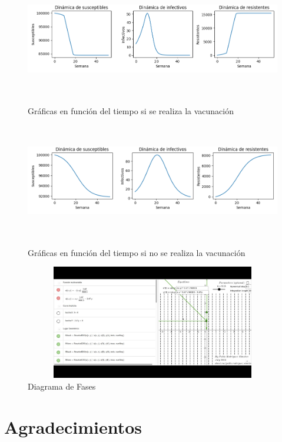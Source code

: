 \documentclass{wscpaperproc}
\theoremstyle{wsc}
\begin{document}
\begin{figure}
	\centering
	\includegraphics[width=1.0\textwidth,height=5cm]{Figure_1.png}
	\caption{Gráficas en función del tiempo si se realiza la vacunación}
	\centering
	\includegraphics[width=1.0\textwidth,height=5cm]{Figure_2.png}
	\caption{Gráficas en función del tiempo si no se realiza la vacunación}\centering
	\includegraphics[width=1.0\textwidth,height=5cm]{fig3.jpg}
	\caption{Diagrama de Fases }

  \end{figure}




\clearpage
\section*{Agradecimientos}


\appendix

\clearpage
\end{document}
